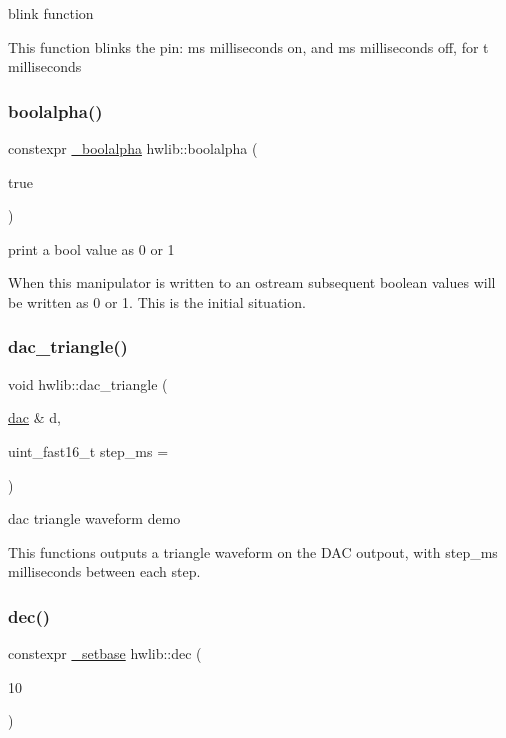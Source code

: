 blink function

This function blinks the pin\+: ms milliseconds on, and ms milliseconds off, for t milliseconds \mbox{\label{namespacehwlib_a499e8cd6806e66c4c425b64c9512a21c}} 
\subsubsection{\texorpdfstring{boolalpha()}{boolalpha()}}
{\footnotesize\ttfamily constexpr \hyperlink{structhwlib_1_1__boolalpha}{\+\_\+boolalpha} hwlib\+::boolalpha (\begin{DoxyParamCaption}\item[{true}]{ }\end{DoxyParamCaption})}

print a bool value as \textquotesingle{}0\textquotesingle{} or \textquotesingle{}1\textquotesingle{}

When this manipulator is written to an ostream subsequent boolean values will be written as \textquotesingle{}0\textquotesingle{} or \textquotesingle{}1\textquotesingle{}. This is the initial situation. \mbox{\label{namespacehwlib_a25454b1b1a7ef5887e55704c3b2fe5b0}} 
\subsubsection{\texorpdfstring{dac\+\_\+triangle()}{dac\_triangle()}}
{\footnotesize\ttfamily void hwlib\+::dac\+\_\+triangle (\begin{DoxyParamCaption}\item[{\hyperlink{classhwlib_1_1dac}{dac} \&}]{d,  }\item[{uint\+\_\+fast16\+\_\+t}]{step\+\_\+ms = {} }\end{DoxyParamCaption})}



dac triangle waveform demo 

This functions outputs a triangle waveform on the D\+AC outpout, with step\+\_\+ms milliseconds between each step. \mbox{\label{namespacehwlib_ab8f3a2357c88d53861c09dbd17f14f1b}} 
\subsubsection{\texorpdfstring{dec()}{dec()}}
{\footnotesize\ttfamily constexpr \hyperlink{structhwlib_1_1__setbase}{\+\_\+setbase} hwlib\+::dec (\begin{DoxyParamCaption}\item[{10}]{ }\end{DoxyParamCaption})}

